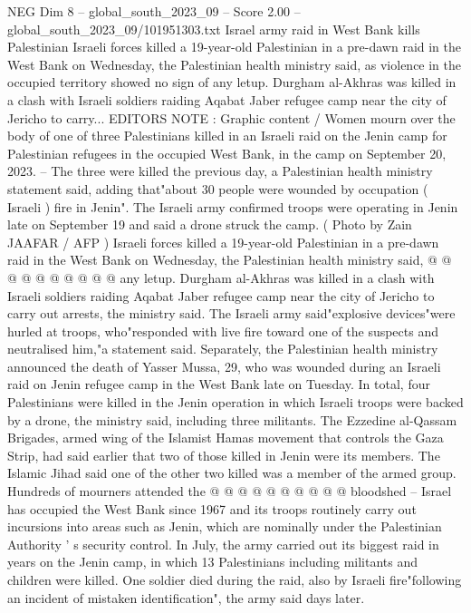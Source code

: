 \begin{textsample}{NEG Dim 8 – global\_south\_2023\_09 – Score 2.00 – global\_south\_2023\_09/101951303.txt}  \label{ex:f8_neg_325}
Israel army raid in West Bank kills Palestinian Israeli forces killed a 19-year-old Palestinian in a pre-dawn raid in the West Bank on Wednesday, the Palestinian health ministry said, as violence in the occupied territory showed no sign of any letup.
Durgham al-Akhras was killed in a clash with Israeli soldiers raiding Aqabat Jaber refugee camp near the city of Jericho to carry...
EDITORS NOTE : Graphic content / Women mourn over the body of one of three Palestinians killed in an Israeli raid on the Jenin camp for Palestinian refugees in the occupied West Bank, in the camp on September 20, 2023. -- The three were killed the previous day, a Palestinian health ministry statement said, adding that"about 30 people were wounded by occupation ( Israeli ) fire in Jenin".
The Israeli army confirmed troops were operating in Jenin late on September 19 and said a drone struck the camp. ( Photo by Zain JAAFAR / AFP ) Israeli forces killed a 19-year-old Palestinian in a pre-dawn raid in the West Bank on Wednesday, the Palestinian health ministry said, @ @ @ @ @ @ @ @ @ @ any letup.
Durgham al-Akhras was killed in a clash with Israeli soldiers raiding Aqabat Jaber refugee camp near the city of Jericho to carry out arrests, the ministry said.
The Israeli army said"explosive devices"were hurled at troops, who"responded with live fire toward one of the suspects and neutralised him,"a statement said.
Separately, the Palestinian health ministry announced the death of Yasser Mussa, 29, who was wounded during an Israeli raid on Jenin refugee camp in the West Bank late on Tuesday.
In total, four Palestinians were killed in the Jenin operation in which Israeli troops were backed by a drone, the ministry said, including three militants.
The Ezzedine al-Qassam Brigades, armed wing of the Islamist Hamas movement that controls the Gaza Strip, had said earlier that two of those killed in Jenin were its members.
The Islamic Jihad said one of the other two killed was a member of the armed group.
Hundreds of mourners attended the @ @ @ @ @ @ @ @ @ @ bloodshed -- Israel has occupied the West Bank since 1967 and its troops routinely carry out incursions into areas such as Jenin, which are nominally under the Palestinian Authority ' s security control.
In July, the army carried out its biggest raid in years on the Jenin camp, in which 13 Palestinians including militants and children were killed.
One soldier died during the raid, also by Israeli fire"following an incident of mistaken identification", the army said days later.

\end{textsample}
